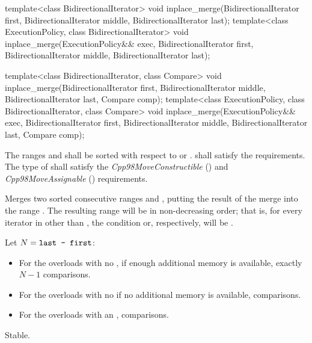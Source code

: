 %
\begin{itemdecl}
template<class BidirectionalIterator>
  void inplace_merge(BidirectionalIterator first,
                     BidirectionalIterator middle,
                     BidirectionalIterator last);
template<class ExecutionPolicy, class BidirectionalIterator>
  void inplace_merge(ExecutionPolicy&& exec,
                     BidirectionalIterator first,
                     BidirectionalIterator middle,
                     BidirectionalIterator last);

template<class BidirectionalIterator, class Compare>
  void inplace_merge(BidirectionalIterator first,
                     BidirectionalIterator middle,
                     BidirectionalIterator last, Compare comp);
template<class ExecutionPolicy, class BidirectionalIterator, class Compare>
  void inplace_merge(ExecutionPolicy&& exec,
                     BidirectionalIterator first,
                     BidirectionalIterator middle,
                     BidirectionalIterator last, Compare comp);
\end{itemdecl}

\begin{itemdescr}
\pnum
\requires
The ranges  and  shall be
sorted with respect to  or .
 shall satisfy the
 requirements. The type
of  shall satisfy the
\textit{Cpp98MoveConstructible} () and
\textit{Cpp98MoveAssignable} () requirements.

\pnum
\effects
Merges two sorted consecutive ranges
and
,
putting the result of the merge into the range
.
The resulting range will be in non-decreasing order;
that is, for every iterator
in
other than
,
the condition
or, respectively,
will be .

\pnum
\complexity Let $N = \texttt{last - first}$:
\begin{itemize}
\item For the overloads with no , if enough additional
memory is available, exactly $N - 1$ comparisons.
\item For the overloads with no  if no additional
memory is available,   comparisons.
\item For the overloads with an ,  comparisons.
\end{itemize}

\pnum
\remarks Stable.
\end{itemdescr}

